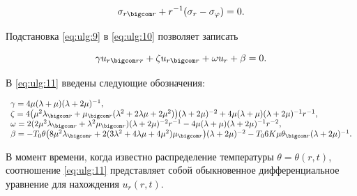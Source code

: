 \begin{equation} 

\label{eq:ulg:10} 

\sigma _{r\bigcom r} +r^{-1} (\sigma _{r} -\sigma _{\varphi } )=0. 

\end{equation} 

Подстановка \eqref{eq:ulg:9} в \eqref{eq:ulg:10} позволяет записать

\begin{equation} 

\label{eq:ulg:11} 

\gamma u_{r\bigcom rr} +\zeta u_{r\bigcom r} +\omega u_{r} +\beta =0.

\end{equation} 

 

В \eqref{eq:ulg:11} введены следующие обозначения:

\[\begin{array}{l} 

\gamma =4\mu (\lambda +\mu )(\lambda +2\mu )^{-1} , 

\\ 

\zeta =4\bigl(\mu ^{2} \lambda _{\bigcom r} +\mu _{\bigcom r} (\lambda ^{2} +2\lambda \mu +2\mu ^{2} )\bigr)

(\lambda +2\mu )^{-2} +4\mu (\lambda +\mu )(\lambda +2\mu )^{-1} r^{-1} , 

\\ 

\omega =2(2\mu ^{2} \lambda _{\bigcom r} +\lambda ^{2} \mu _{\bigcom r} )

(\lambda +2\mu )^{-2} r^{-1} -4\mu (\lambda +\mu )(\lambda +2\mu )^{-1} r^{-2} , 

\\ 

\beta =-T_{0}\theta \bigl(8\mu ^{2} \lambda _{\bigcom r} +2(3\lambda ^{2} +4\lambda \mu +4\mu ^{2} )\mu _{\bigcom r} \bigr)

(\lambda +2\mu )^{-2} -T_{0}6K\mu \theta _{\bigcom r} (\lambda +2\mu )^{-1} . 

\end{array}

\] 

  

В момент времени, когда известно распределение температуры $\theta =\theta (r,t)$, соотношение \eqref{eq:ulg:11} представляет собой обыкновенное дифференциальное уравнение для нахождения $u_{r} (r,t)$.

